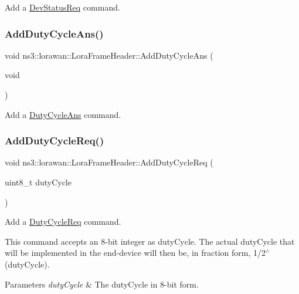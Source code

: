 Add a \hyperlink{classns3_1_1lorawan_1_1DevStatusReq}{Dev\+Status\+Req} command. \mbox{\label{classns3_1_1lorawan_1_1LoraFrameHeader_ade22e8653e98a0ceeada027f16a41fa7}} 
\subsubsection{\texorpdfstring{Add\+Duty\+Cycle\+Ans()}{AddDutyCycleAns()}}
{\footnotesize\ttfamily void ns3\+::lorawan\+::\+Lora\+Frame\+Header\+::\+Add\+Duty\+Cycle\+Ans (\begin{DoxyParamCaption}\item[{void}]{ }\end{DoxyParamCaption})}

Add a \hyperlink{classns3_1_1lorawan_1_1DutyCycleAns}{Duty\+Cycle\+Ans} command. \mbox{\label{classns3_1_1lorawan_1_1LoraFrameHeader_a09b2408b1481fe4d4ca84e6f977c19d7}} 
\subsubsection{\texorpdfstring{Add\+Duty\+Cycle\+Req()}{AddDutyCycleReq()}}
{\footnotesize\ttfamily void ns3\+::lorawan\+::\+Lora\+Frame\+Header\+::\+Add\+Duty\+Cycle\+Req (\begin{DoxyParamCaption}\item[{uint8\+\_\+t}]{duty\+Cycle }\end{DoxyParamCaption})}

Add a \hyperlink{classns3_1_1lorawan_1_1DutyCycleReq}{Duty\+Cycle\+Req} command.

This command accepts an 8-\/bit integer as duty\+Cycle. The actual duty\+Cycle that will be implemented in the end-\/device will then be, in fraction form, 1/2$^\wedge$(duty\+Cycle).


\begin{DoxyParams}{Parameters}
{\em duty\+Cycle} & The duty\+Cycle in 8-\/bit form. \\
\hline
\end{DoxyParams}
\mbox{\label{classns3_1_1lorawan_1_1LoraFrameHeader_abf2caf5f060666e1e896e698ac783232}} 
